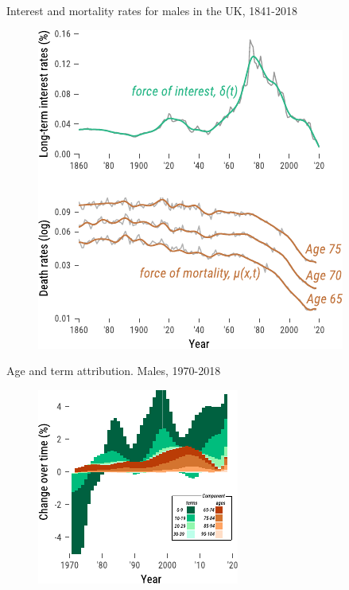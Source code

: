 \documentclass[10pt]{beamer}
\begin{document}
\begin{frame}{Interest and mortality rates for males in the UK, 1841-2018}
\begin{figure}
	\centering
	\hspace*{-0.9cm}
	\includegraphics[scale=1.1] {Fig/deltamu.pdf}
\end{figure}
\end{frame}

\begin{frame}{Age and term attribution. Males, 1970-2018}
\begin{figure}
	\centering
	\hspace*{-0.9cm}
	\includegraphics[scale=1.5] {Fig/DescAge.pdf}
\end{figure}
\end{frame}
\end{document}
